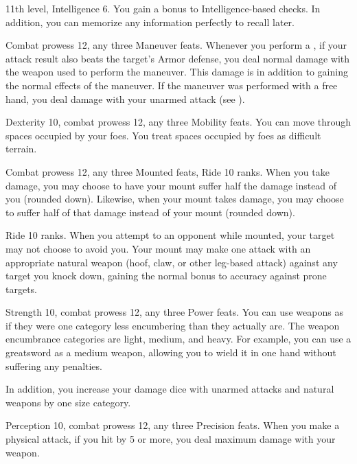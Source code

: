 \featpres 11th level, Intelligence 6.
\featben You gain a  bonus to Intelligence-based checks.
In addition, you can memorize any information perfectly to recall later.

\featpres Combat prowess 12, any three Maneuver feats.
\featben Whenever you perform a , if your attack result also beats the target's Armor defense, you deal normal damage with the weapon used to perform the maneuver.
This damage is in addition to gaining the normal effects of the maneuver.
If the maneuver was performed with a free hand, you deal damage with your unarmed attack (see ).

\featpres Dexterity 10, combat prowess 12, any three Mobility feats.
\featben You can move through spaces occupied by your foes.
You treat spaces occupied by foes as difficult terrain.

\featpres Combat prowess 12, any three Mounted feats, Ride 10 ranks.
\featben When you take damage, you may choose to have your mount suffer half the damage instead of you (rounded down).
Likewise, when your mount takes damage, you may choose to suffer half of that damage instead of your mount (rounded down).

\featpre Ride 10 ranks.
\featben When you attempt to  an opponent while mounted, your target may not choose to avoid you.
Your mount may make one attack with an appropriate natural weapon (hoof, claw, or other leg-based attack) against any target you knock down, gaining the normal  bonus to accuracy against prone targets.

\featpres Strength 10, combat prowess 12, any three Power feats.
\featben You can use weapons as if they were one category less encumbering than they actually are.
The weapon encumbrance categories are light, medium, and heavy.
For example, you can use a greatsword as a medium weapon, allowing you to wield it in one hand without suffering any penalties.

In addition, you increase your damage dice with unarmed attacks and natural weapons by one size category.

\featpres Perception 10, combat prowess 12, any three Precision feats.
\featben When you make a physical attack, if you hit by 5 or more, you deal maximum damage with your weapon.

